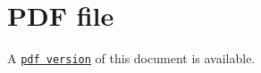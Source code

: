  

 \hypertarget{index_pdf}{}\section{P\+D\+F file}\label{index_pdf}
A \href{../latex/refman.pdf}{\tt pdf version} of this document is available. 
